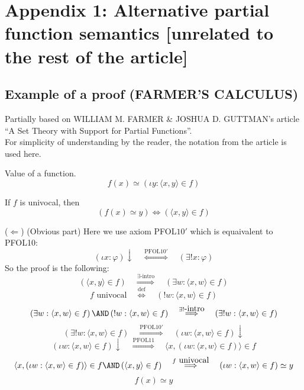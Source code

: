 \def\topic{Farmer's calculus}


\section{Appendix 1: Alternative partial function semantics [unrelated to the rest of the article]}
\subsection{Example of a proof (FARMER'S CALCULUS)}
Partially based on WILLIAM M. FARMER \& JOSHUA D. GUTTMAN's article\\
``A Set Theory with Support for Partial Functions''.\\
For simplicity of understanding by the reader, the notation from the article is used here.\\
\begin{definition} Value of a function.
\[
f(x) \simeq \left(\iota y: \langle x,y\rangle\in f\right)
\]
\end{definition}

\begin{theorem} If $f$ is univocal, then
\[
\left(f(x)\simeq y\right)\iff \left(\langle x,y\rangle\in f\right)
\]
\end{theorem}
\Proof
($\Leftarrow$) (Obvious part) Here we use axiom PFOL$10'$ which is equaivalent to PFOL10:
\[
(\iota x:\varphi)\downarrow
\quad\overset{\mbox{PFOL10}'}{\Longleftrightarrow}\quad
(\exists!x:\varphi)
\]
So the proof is the following:
\[
\left(\langle x,y\rangle\in f\right)
\quad\overset{\exists\mbox{-intro}}{\Longrightarrow}\quad
\left(\exists w: \langle x,w\rangle\in f\right)
\]
\[
f\mbox{ univocal}
\quad\overset{\mbox{def}}{\Longleftrightarrow}\quad
\left(! w: \langle x,w\rangle\in f\right)
\]
\[
\left(\exists w: \langle x,w\rangle\in f\right)
\AND
\left(! w: \langle x,w\rangle\in f\right)
\quad\overset{\exists!\mbox{-intro}}{\Longrightarrow}\quad
\left(\exists! w: \langle x,w\rangle\in f\right)
\]
\[
\left(\exists! w: \langle x,w\rangle\in f\right)
\quad\overset{\mbox{PFOL10}'}{\Longrightarrow}\quad
\left(\iota w: \langle x,w\rangle\in f\right)\downarrow
\]
\[
\left(\iota w: \langle x,w\rangle\in f\right)\downarrow 
\quad\overset{\mbox{PFOL11}}{\Longrightarrow}\quad
\langle x,(\iota w: \langle x,w\rangle\in f)\rangle\in f
\]
\[
\langle x,(\iota w: \langle x,w\rangle\in f)\rangle\in f
\AND
\left(\langle x,y\rangle\in f\right)
\quad\overset{f \mbox{ univocal}}{\Longrightarrow}\quad
(\iota w: \langle x,w\rangle\in f) \simeq y
\]
\[
f(x) \simeq y
\]

